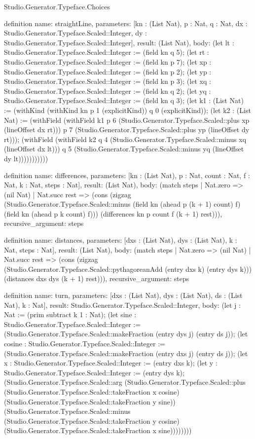 \begin{lexlean}{Studio.Generator.Typeface.Choices}
\begin{semanticmodule}
definition{
  name: straightLine,
  parameters: [kn : (List Nat), p : Nat, q : Nat, dx : Studio.Generator.Typeface.Scaled::Integer, dy : Studio.Generator.Typeface.Scaled::Integer],
  result: (List Nat),
  body: (let lt : Studio.Generator.Typeface.Scaled::Integer := (field kn q 5); (let rt : Studio.Generator.Typeface.Scaled::Integer := (field kn p 7); (let xp : Studio.Generator.Typeface.Scaled::Integer := (field kn p 2); (let yp : Studio.Generator.Typeface.Scaled::Integer := (field kn p 3); (let xq : Studio.Generator.Typeface.Scaled::Integer := (field kn q 2); (let yq : Studio.Generator.Typeface.Scaled::Integer := (field kn q 3); (let k1 : (List Nat) := (withKind (withKind kn p 1 (explicitKind)) q 0 (explicitKind)); (let k2 : (List Nat) := (withField (withField k1 p 6 (Studio.Generator.Typeface.Scaled::plus xp (lineOffset dx rt))) p 7 (Studio.Generator.Typeface.Scaled::plus yp (lineOffset dy rt))); (withField (withField k2 q 4 (Studio.Generator.Typeface.Scaled::minus xq (lineOffset dx lt))) q 5 (Studio.Generator.Typeface.Scaled::minus yq (lineOffset dy lt)))))))))))
}

definition{
  name: differences,
  parameters: [kn : (List Nat), p : Nat, count : Nat, f : Nat, k : Nat, steps : Nat],
  result: (List Nat),
  body: (match steps
    | Nat.zero => (nil Nat)
    | Nat.succ rest => (cons (zigzag (Studio.Generator.Typeface.Scaled::minus (field kn (ahead p (k + 1) count) f) (field kn (ahead p k count) f))) (differences kn p count f (k + 1) rest))),
  recursive_argument: steps
}

definition{
  name: distances,
  parameters: [dxs : (List Nat), dys : (List Nat), k : Nat, steps : Nat],
  result: (List Nat),
  body: (match steps
    | Nat.zero => (nil Nat)
    | Nat.succ rest => (cons (zigzag (Studio.Generator.Typeface.Scaled::pythagoreanAdd (entry dxs k) (entry dys k))) (distances dxs dys (k + 1) rest))),
  recursive_argument: steps
}

definition{
  name: turn,
  parameters: [dxs : (List Nat), dys : (List Nat), ds : (List Nat), k : Nat],
  result: Studio.Generator.Typeface.Scaled::Integer,
  body: (let j : Nat := (prim subtract k 1 : Nat); (let sine : Studio.Generator.Typeface.Scaled::Integer := (Studio.Generator.Typeface.Scaled::makeFraction (entry dys j) (entry ds j)); (let cosine : Studio.Generator.Typeface.Scaled::Integer := (Studio.Generator.Typeface.Scaled::makeFraction (entry dxs j) (entry ds j)); (let x : Studio.Generator.Typeface.Scaled::Integer := (entry dxs k); (let y : Studio.Generator.Typeface.Scaled::Integer := (entry dys k); (Studio.Generator.Typeface.Scaled::arg (Studio.Generator.Typeface.Scaled::plus (Studio.Generator.Typeface.Scaled::takeFraction x cosine) (Studio.Generator.Typeface.Scaled::takeFraction y sine)) (Studio.Generator.Typeface.Scaled::minus (Studio.Generator.Typeface.Scaled::takeFraction y cosine) (Studio.Generator.Typeface.Scaled::takeFraction x sine))))))))
}


\end{semanticmodule}
\end{lexlean}
